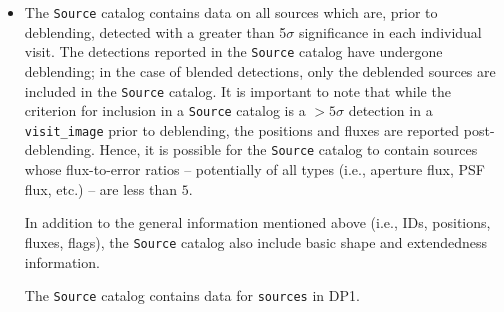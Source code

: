 \begin{itemize}
\item The \texttt{Source} catalog contains data on all sources which are, prior to deblending, detected with a greater than 5$\sigma$ significance in each individual visit.
The detections reported in the \texttt{Source} catalog have undergone deblending; in the case of blended detections, only the deblended sources are included in the \texttt{Source} catalog.
It is important to note that while the criterion for inclusion in a \texttt{Source} catalog is a $>5\sigma$ detection in a \texttt{visit\_image} prior to deblending, the positions and fluxes are reported post-deblending. Hence, it is possible for the \texttt{Source} catalog to contain sources whose flux-to-error ratios -- potentially of all types (i.e., aperture flux, PSF flux, etc.) -- are less than $5$.    

In addition to the general information mentioned above (i.e., IDs, positions, fluxes, flags), the \texttt{Source} catalog also include basic shape and extendedness information.

The \texttt{Source} catalog contains data for \nsources \texttt{sources} in DP1.



\end{itemize}
